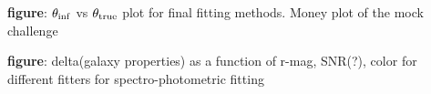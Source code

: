 


{\bf figure}: $\theta_{\rm inf}$ vs $\theta_{\rm true}$ plot for final fitting methods. Money plot of the mock challenge 

{\bf figure}: delta(galaxy properties) as a function of r-mag, SNR(?), color for different fitters for spectro-photometric fitting 

